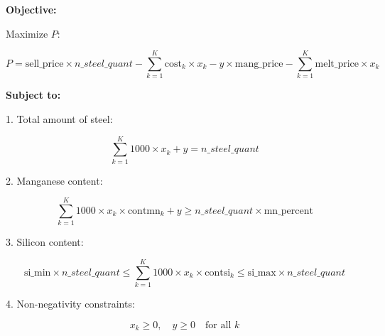 \documentclass{article}
\begin{document}
\textbf{Objective:}

Maximize \( P \):

\[
P = \text{sell\_price} \times n\_steel\_quant - \sum_{k=1}^{K} \text{cost}_{k} \times x_k - y \times \text{mang\_price} - \sum_{k=1}^{K} \text{melt\_price} \times x_k
\]

\textbf{Subject to:}

1. Total amount of steel:

\[
\sum_{k=1}^{K} 1000 \times x_k + y = n\_steel\_quant
\]

2. Manganese content:

\[
\sum_{k=1}^{K} 1000 \times x_k \times \text{contmn}_{k} + y \geq n\_steel\_quant \times \text{mn\_percent}
\]

3. Silicon content:

\[
\text{si\_min} \times n\_steel\_quant \leq \sum_{k=1}^{K} 1000 \times x_k \times \text{contsi}_{k} \leq \text{si\_max} \times n\_steel\_quant
\]

4. Non-negativity constraints:

\[
x_k \geq 0, \quad y \geq 0 \quad \text{for all } k
\]
\end{document}
